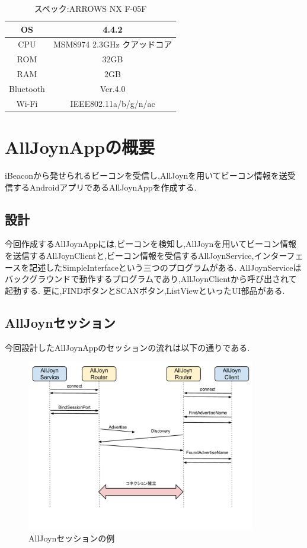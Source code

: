 \begin{table}[htbp]
\centering
\begin{tabular}{|c|c|} \hline
OS &  4.4.2 \\ \hline
CPU & MSM8974 2.3GHz クアッドコア \\ \hline
ROM & 32GB \\ \hline
RAM & 2GB \\ \hline
Bluetooth & Ver.4.0 \\ \hline
Wi-Fi & IEEE802.11a/b/g/n/ac \\ \hline
\end{tabular}
\caption{スペック:ARROWS NX F-05F}
\end{table}


\section{AllJoynAppの概要}
iBeaconから発せられるビーコンを受信し,AllJoynを用いてビーコン情報を送受信するAndroidアプリであるAllJoynAppを作成する.


\subsection{設計}
今回作成するAllJoynAppには,ビーコンを検知し,AllJoynを用いてビーコン情報を送信するAllJoynClientと,ビーコン情報を受信するAllJoynService,インターフェースを記述したSimpleInterfaceという三つのプログラムがある.
AllJoynServiceはバックグラウンドで動作するプログラムであり,AllJoynClientから呼び出されて起動する.
更に,FINDボタンとSCANボタン,ListViewといったUI部品がある.


\subsection{AllJoynセッション}
今回設計したAllJoynAppのセッションの流れは以下の通りである.

\begin{figure}[htbp]
\centering
\includegraphics[width=10cm]{fig/AllJoyn_Session.pdf}
\caption{AllJoynセッションの例}
\end{figure}

